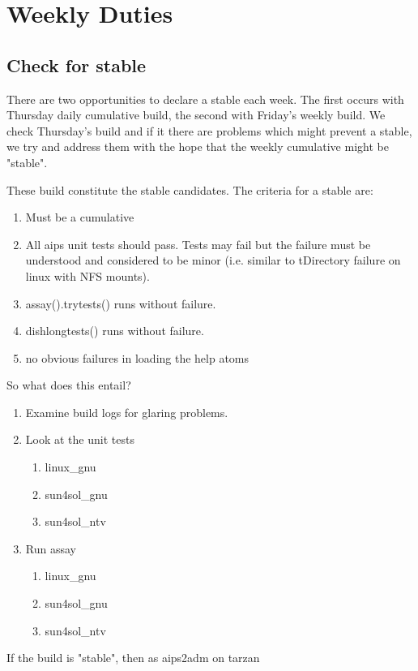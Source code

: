 \chapter{Weekly Duties}
\section{Check for stable}
There are two opportunities to declare a stable each week. The first occurs with Thursday daily 
cumulative build, the second with Friday's weekly build.  We check Thursday's build and if it there
are problems which might prevent a stable, we try and address them with the hope that the weekly
cumulative might be "stable".

These build constitute the stable candidates.  The criteria for a stable are:
\begin{enumerate}
\item Must be a cumulative
\item All aips unit tests should pass. Tests may fail but the failure must be understood and
considered to be minor (i.e. similar to tDirectory failure on linux with NFS mounts).
\item assay().trytests() runs without failure.
\item dishlongtests() runs without failure.
\item no obvious failures in loading the help atoms
\end{enumerate}
So what does this entail?
\begin{enumerate}
\item Examine build logs for glaring problems. 
\item Look at the unit tests
\begin{enumerate}
\item{linux\_gnu}
\item{sun4sol\_gnu}
\item{sun4sol\_ntv}
\end{enumerate}
\item Run assay
\begin{enumerate}
\item{linux\_gnu}
\item{sun4sol\_gnu}
\item{sun4sol\_ntv}
\end{enumerate}
\end{enumerate}
If the build is "stable", then as aips2adm on tarzan
